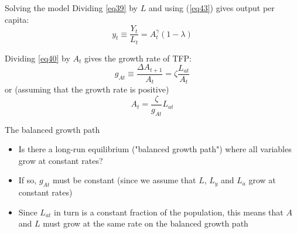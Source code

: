 \documentclass[10pt,handout]{beamer}
\begin{document}
\begin{frame}{Solving the model}
    Dividing \eqref{eq39} by $L$ and using (\ref{eq43}) gives output per capita: 
    \begin{equation}\label{eq44}
        y_t \equiv \frac{Y_t}{L_t} = A_t^\gamma (1-\lambda)
    \end{equation}

    Dividing \eqref{eq40} by $A_t$ gives the growth rate of TFP:
    \begin{equation*}
        g_{At} \equiv \frac{\Delta A_{t+1}}{A_t} = \zeta \frac{L_{at}}{A_t}
    \end{equation*}
    or (assuming that the growth rate is positive)
    \begin{equation}\label{eq45}
        A_t = \frac{\zeta}{g_{At}}L_{at}
    \end{equation}
\end{frame}


\begin{frame}{The balanced growth path}
\begin{itemize}
    \item Is there a long-run equilibrium ("balanced growth path") where all variables grow at constant rates? \smallskip

    \item If so, $g_{At}$ must be constant (since we assume that $L$, $L_y$ and $L_a$ grow at constant rates)
     \smallskip

    \item Since $L_{at}$ in turn is a constant fraction of the population, this means that $A$ and $L$ must grow at the same rate on the balanced growth path
\end{itemize}
\end{frame}
\end{document}
